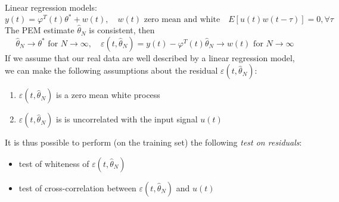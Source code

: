 \documentclass{book}
\theoremstyle{definition}
\theoremstyle{remark}
\theoremstyle{remark}
\begin{document}
Linear regression models:
\[
    y(t)=\varphi^T(t) \theta^*+w(t), \quad w(t) \text{ zero mean and white} \quad E[u(t)w(t-\tau)]=0,\forall \tau
\]
The PEM estimate $\hat{\theta}_N$ is consistent, then
\[
    \hat{\theta}_N \to \theta^* \text{ for } N\to \infty , \quad \varepsilon(t,\hat{\theta}_N)=y(t)-\varphi^T(t)\hat{\theta}_N \to w(t) \text{ for } N\to\infty
\]
If we assume that our real data are well described by a linear regression model, we can make the following assumptions about the residual $\varepsilon(t,\hat{\theta}_N)$:
\begin{enumerate}
    \item $\varepsilon(t,\hat{\theta}_N)$ is a zero mean white process
    \item $\varepsilon(t,\hat{\theta}_N)$ is is uncorrelated with the input signal $u(t)$
\end{enumerate}
It is thus possible to perform (on the training set) the following \emph{test on residuals}:
\begin{itemize}
    \item test of whiteness of $\varepsilon(t,\hat{\theta}_N)$
    \item test of cross-correlation between $\varepsilon(t,\hat{\theta}_N)$ and $u(t)$
\end{itemize}
\end{document}
